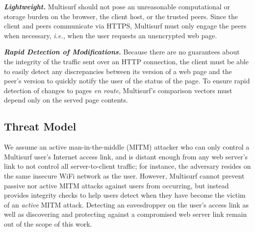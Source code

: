 \textbf{\textit{Lightweight.}} Multisurf should not pose an unreasonable computational or storage burden on the browser, the client host, or the trusted peers. 
Since the client and peers communicate via HTTPS, Multisurf must only engage the peers when necessary, \emph{i.e.,} when the user requests an unencrypted web page.

\textbf{\textit{Rapid Detection of Modifications.}} Because there are no guarantees about the integrity of the traffic sent over an HTTP connection, the client must be able to easily detect any discrepancies between its version of a web page and the peer's version to quickly notify the user of the status of the page. 
To ensure rapid detection of changes to pages \emph{en route}, Multisurf's comparison vectors must depend only on the served page contents.

\subsection{Threat Model} 
\label{sec:sec:threat}
We assume an active man-in-the-middle (MITM) attacker who can only control a Multisurf user's Internet access link, and is distant enough from any web server's link to not control all server-to-client traffic; for instance, the adversary resides on the same insecure WiFi network as the user.
However, Multisurf cannot prevent passive nor active MITM attacks against users from occurring, but instead provides integrity checks to help users detect when they have become the victim of an \emph{active} MITM attack. 
Detecting an eavesdropper on the user's access link as well as discovering and protecting against a compromised web server link remain out of the scope of this work.